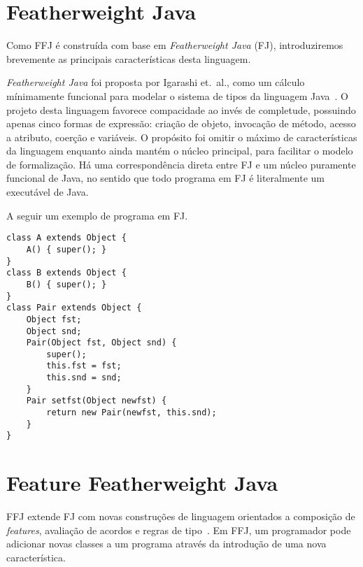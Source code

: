 	\section{Featherweight Java}

	Como FFJ é construída com base em \textit{Featherweight Java} (FJ), introduziremos
brevemente as principais características desta linguagem.

\textit{Featherweight Java} foi proposta por Igarashi et.\ al., como um cálculo 
mínimamente funcional para modelar o sistema de tipos da linguagem Java~\cite{Igarashi99featherweightjava}.
O projeto desta linguagem favorece compacidade ao invés de completude, possuindo apenas 
cinco formas de expressão: criação de objeto, invocação de método, acesso a atributo, 
coerção e variáveis. O propósito foi omitir o máximo de características da linguagem 
enquanto ainda mantém o núcleo principal, para facilitar o modelo de formalização. Há 
uma correspondência direta entre FJ e um núcleo puramente funcional de Java, no sentido 
que todo programa em FJ é literalmente um executável de Java.


A seguir um exemplo de programa em FJ.

\begin{lstlisting}
class A extends Object {
	A() { super(); }
}
class B extends Object {
	B() { super(); }
}
class Pair extends Object {
	Object fst;
	Object snd;
	Pair(Object fst, Object snd) {
		super();
		this.fst = fst;
		this.snd = snd;
	}
	Pair setfst(Object newfst) {
		return new Pair(newfst, this.snd);
	}
}
\end{lstlisting}

\section{Feature Featherweight Java}

FFJ extende FJ com novas construções de linguagem orientados a composição de \textit{features}\cite{fop}, avaliação de acordos e regras de tipo~\cite{Apel08featurefeatherweight}. Em FFJ, um programador 
pode adicionar novas classes a um programa através da introdução de uma nova característica.
	








